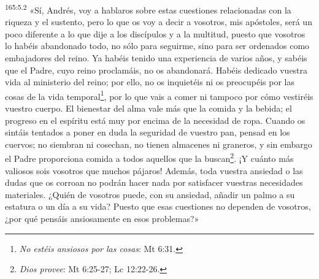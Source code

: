 \par 
\textsuperscript{165:5.2} «Sí, Andrés, voy a hablaros sobre estas cuestiones relacionadas con la riqueza y el sustento, pero lo que os voy a decir a vosotros, mis apóstoles, será un poco diferente a lo que dije a los discípulos y a la multitud, puesto que vosotros lo habéis abandonado todo, no sólo para seguirme, sino para ser ordenados como embajadores del reino. Ya habéis tenido una experiencia de varios años, y sabéis que el Padre, cuyo reino proclamáis, no os abandonará. Habéis dedicado vuestra vida al ministerio del reino; por ello, no os inquietéis ni os preocupéis por las cosas de la vida temporal\footnote{\textit{No estéis ansiosos por las cosas}: Mt 6:31.}, por lo que vais a comer ni tampoco por cómo vestiréis vuestro cuerpo. El bienestar del alma vale más que la comida y la bebida; el progreso en el espíritu está muy por encima de la necesidad de ropa. Cuando os sintáis tentados a poner en duda la seguridad de vuestro pan, pensad en los cuervos; no siembran ni cosechan, no tienen almacenes ni graneros, y sin embargo el Padre proporciona comida a todos aquellos que la buscan\footnote{\textit{Dios provee}: Mt 6:25-27; Lc 12:22-26.}. ¡Y cuánto más valiosos sois vosotros que muchos pájaros! Además, toda vuestra ansiedad o las dudas que os corroan no podrán hacer nada por satisfacer vuestras necesidades materiales. ¿Quién de vosotros puede, con su ansiedad, añadir un palmo a su estatura o un día a su vida? Puesto que esas cuestiones no dependen de vosotros, ¿por qué pensáis ansiosamente en esos problemas?»

